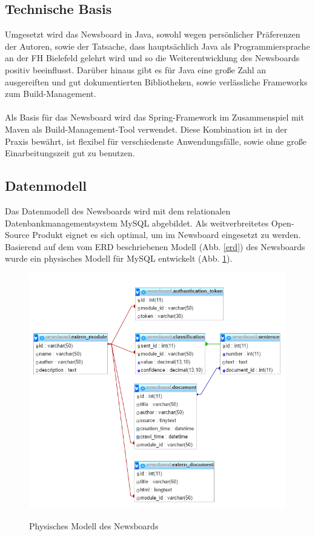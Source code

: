 \subsection{Technische Basis}
Umgesetzt wird das Newsboard in Java, sowohl wegen persönlicher Präferenzen der Autoren,
sowie der Tatsache, dass hauptsächlich Java als Programmiersprache
an der FH Bielefeld gelehrt wird und so die Weiterentwicklung des Newsboards
positiv beeinflusst. Darüber hinaus gibt es für Java eine große Zahl an ausgereiften
und gut dokumentierten Bibliotheken, sowie verlässliche Frameworks zum 
Build-Management. \\ \\
Als Basis für das Newsboard wird das Spring-Framework im Zusammenspiel mit Maven
als Build-Management-Tool verwendet. Diese Kombination ist in der Praxis bewährt,
ist flexibel für verschiedenste Anwendungsfälle, sowie ohne große Einarbeitungszeit
gut zu benutzen.

\subsection{Datenmodell}
Das Datenmodell des Newsboards wird mit dem relationalen Datenbankmanagementsystem MySQL
abgebildet. Als weitverbreitetes Open-Source Produkt eignet es sich optimal, um im
Newsboard eingesetzt zu werden. Basierend auf dem vom ERD beschriebenen Modell
(Abb. \ref{erd}) des Newsboards wurde ein physisches Modell für MySQL entwickelt
(Abb. \ref{physical_model}). \\

\begin{figure}[h]
	\centering
	\includegraphics[scale=0.8]{content/physical-model.png}
	\label{physical_model}
	\caption{Physisches Modell des Newsboards}
\end{figure}

